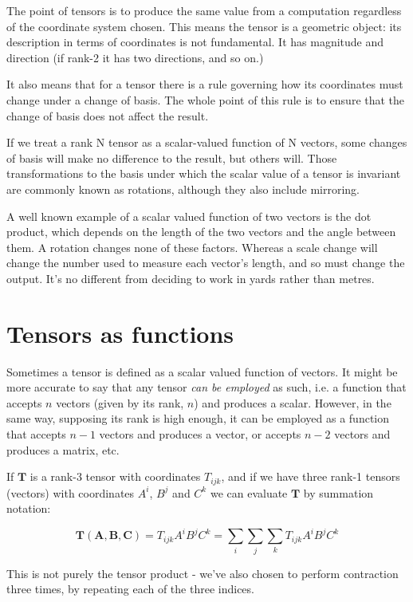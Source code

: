 The point of tensors is to produce the same value from a computation regardless of the coordinate system chosen. This means the tensor is a geometric object: its description in terms of coordinates is not fundamental. It has magnitude and direction (if rank-2 it has two directions, and so on.)

It also means that for a tensor there is a rule governing how its coordinates must change under a change of basis. The whole point of this rule is to ensure that the change of basis does not affect the result.

If we treat a rank N tensor as a scalar-valued function of N vectors, some changes of basis will make no difference to the result, but others will. Those transformations to the basis under which the scalar value of a tensor is invariant are commonly known as rotations, although they also include mirroring.

A well known example of a scalar valued function of two vectors is the dot product, which depends on the length of the two vectors and the angle between them. A rotation changes none of these factors. Whereas a scale change will change the number used to measure each vector's length, and so must change the output. It's no different from deciding to work in yards rather than metres.

\section{Tensors as functions}

Sometimes a tensor is defined as a scalar valued function of vectors. It might be more accurate to say that any tensor \textit{can be employed} as such, i.e. a function that accepts $n$ vectors (given by its rank, $n$) and produces a scalar. However, in the same way, supposing its rank is high enough, it can be employed as a function that accepts $n-1$ vectors and produces a vector, or accepts $n-2$ vectors and produces a matrix, etc.

If $\boldsymbol{T}$ is a rank-3 tensor with coordinates $T_{ijk}$, and if we have three rank-1 tensors (vectors) with coordinates $A^i$, $B^j$ and $C^k$ we can evaluate $\boldsymbol{T}$ by summation notation:

$$
\boldsymbol{T(A,B,C)}
= T_{ijk}A^iB^jC^k
= \sum_i\sum_j\sum_kT_{ijk}A^iB^jC^k
$$

This is not purely the tensor product - we've also chosen to perform contraction three times, by repeating each of the three indices.

